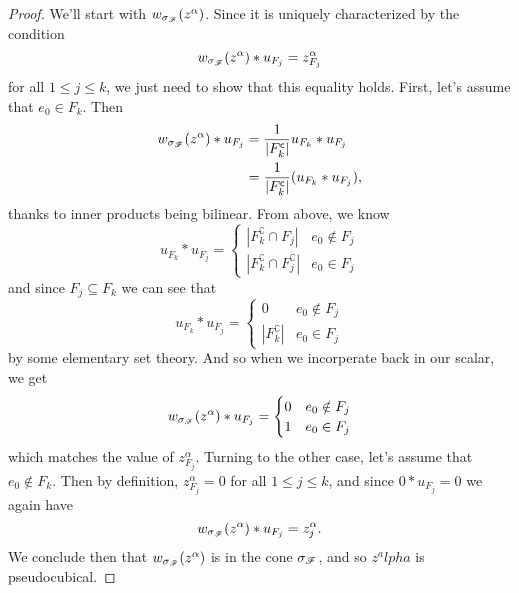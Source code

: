 \documentclass[12pt,oneside]{../../sfsuthesis}
\begin{document}
\begin{proof}
    We'll start with \( w_{\sigma_{\mathscr{F}}}(z^\alpha) \).
    Since it is uniquely characterized by the condition
    \[
        w_{\sigma_{\mathscr{F}}}(z^\alpha) \ast u_{F_j} = z^\alpha_{F_j}
    \]
    for all \( 1 \leq j \leq k \), we just need to show that this equality holds.
    First, let's assume that \( e_0 \in F_k \).
    Then
    \begin{align*}
        w_{\sigma_{\mathscr{F}}}(z^\alpha) \ast u_{F_j} & = {\frac{1}{|F_k^{\mathsf{c}}|}}u_{F_k} \ast u_{F_j}    \\
                                                & = {\frac{1}{|F_k^{\mathsf{c}}|}}(u_{F_k} \ast u_{F_j}),
    \end{align*}
    thanks to inner products being bilinear.
    From above, we know
    \[
        u_{F_k} \ast u_{F_j} = \begin{cases}
            |F_k^\complement \cap F_j|             & e_0 \notin F_j \\
            |F_k^\complement \cap F_j^\complement| & e_0 \in F_j
        \end{cases}
    \]
    and since \( F_j \subseteq F_k \) we can see that
    \[
        u_{F_k} \ast u_{F_j} = \begin{cases}
            0                 & e_0 \notin F_j \\
            |F_k^\complement| & e_0 \in F_j
        \end{cases}
    \]
    by some elementary set theory.
    And so when we incorperate back in our scalar, we get
    \[
        w_{\sigma_{\mathscr{F}}}(z^\alpha) \ast u_{F_j} = \begin{cases}
            0 & e_0 \notin F_j \\
            1 & e_0 \in F_j
        \end{cases}
    \]
    which matches the value of \( z^\alpha_{F_j} \).
    Turning to the other case, let's assume that \( e_0 \notin F_k \).
    Then by definition, \( z^\alpha_{F_j} = 0 \) for all \( 1 \leq j \leq k \), and since \( 0 \ast u_{F_j} = 0 \) we again have
    \[
        w_{\sigma_{\mathscr{F}}}(z^\alpha) \ast u_{F_j} = z^\alpha_j.
    \]
    We conclude then that \( w_{\sigma_{\mathscr{F}}}(z^\alpha) \) is in the cone \( \sigma_{\mathscr{F}} \), and so \( z^alpha \) is pseudocubical.


\end{proof}
\end{document}
